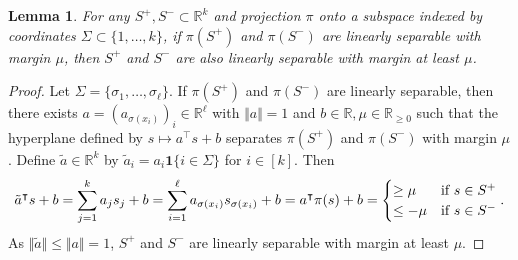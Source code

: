 \documentclass[aoap]{imsart}
\numberwithin{equation}{section}
\newtheorem{lemma}[theorem]{Lemma}
\theoremstyle{definition}
\theoremstyle{remark}
\newcommand{\R}{\mathbb{R}} %
\numberwithin{equation}{section}
\newcommand{\0}{\mathbf{0}}
\newcommand{\1}{\mathbf{1}}
\numberwithin{equation}{section}
\begin{document}
\begin{lemma}\label{lem:proj}
For any $S^{+}, S^{-}\subset \R^{k}$ and projection $\pi$ onto a subspace indexed by coordinates $\Sigma \subset \lbrace 1, \dots , k\rbrace$, if $\pi(S^{+})$ and $\pi (S^{-})$ are linearly separable with margin $\mu$, then $S^{+}$ and $S^-$ are also linearly separable with margin at least $\mu$.
\end{lemma}
\begin{proof}
Let $\Sigma = \lbrace \sigma_{1}, \dots , \sigma_{\ell} \rbrace$. If $\pi(S^{+})$ and $\pi (S^{-})$ are linearly separable, then there exists $a=(a_{\sigma(x_i) })_{i}\in \R^{\ell}$ with $\Vert a\Vert =1$ and $b\in \mathbb{R},\mu\in \mathbb{R}_{\geq 0}$ such that 
 the hyperplane defined by $s\mapsto a^\intercal s+b$ separates $\pi(S^+)$ and $\pi(S^-)$ with margin $\mu$. 
Define $\tilde{a}\in\R^{k}$ by $\tilde{a}_i = a_i\mathbf{1}\{i\in \Sigma\}$ for $i\in [k]$. Then
\[ \tilde{a}^{\intercal}s +b = \sum_{j=1}^{k}a_{j}s_{j}+b=\sum_{i=1}^{\ell} a_{\sigma(x_i) }s_{\sigma(x_i) } +b =a^{\intercal}\pi (s) +b = \begin{cases}
\geq \mu & \textup{if }s\in S^{+}\\
\leq -\mu & \textup{if }s\in S^{-}
\end{cases}.\]
As $\Vert \tilde{a}\Vert \le \Vert a\Vert =1$, $S^+$ and $S^-$ are linearly separable with margin at least $\mu$.
\end{proof}
\end{document}
